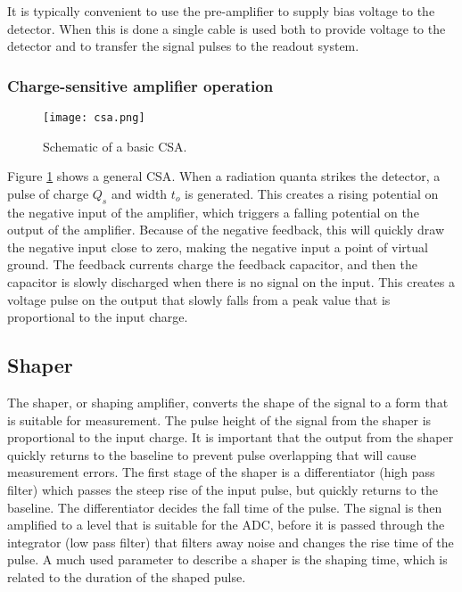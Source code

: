 \documentclass[../main/thesis.tex]{subfiles}
\begin{document}
It is typically convenient to use the pre-amplifier to supply bias voltage to the detector. When this is done a single cable is used both to provide voltage to the detector and to transfer the signal pulses to the readout system. \citep[chap. 16]{Knoll}


\subsubsection{Charge-sensitive amplifier operation}
\label{t-csa}
\begin{figure}%
	\centering
	\texttt{[image: csa.png]}
	\caption{Schematic of a basic \gls{CSA}. \citep{Hamamatsu}}
	\label{fig-csa}
\end{figure}

Figure \ref{fig-csa} shows a general \gls{CSA}. When a radiation quanta strikes the detector, a pulse of charge $Q_s$ and width $t_o$ is generated. This creates a rising potential on the negative input of the amplifier, which triggers a falling potential on the output of the amplifier. Because of the negative feedback, this will quickly draw the negative input close to zero, making the negative input a point of virtual ground. The feedback currents charge the feedback capacitor, and then the capacitor is slowly discharged when there is no signal on the input. This creates a voltage pulse on the output that slowly falls from a peak value that is proportional to the input charge. \citep{Hamamatsu}



\subsection{Shaper}
\label{t-shaper}
The shaper, or shaping amplifier, converts the shape of the signal to a form that is suitable for measurement. The pulse height of the signal from the shaper is proportional to the input charge. It is important that the output from the shaper quickly returns to the baseline to prevent pulse overlapping that will cause measurement errors. The first stage of the shaper is a differentiator (high pass filter) which passes the steep rise of the input pulse, but quickly returns to the baseline. The differentiator decides the fall time of the pulse. The signal is then amplified to a level that is suitable for the \gls{ADC}, before it is passed through the integrator (low pass filter) that filters away noise and changes the rise time of the pulse. A much used parameter to describe a shaper is the shaping time, which is related to the duration of the shaped pulse. \citep[chap. 16]{Knoll}
\end{document}
